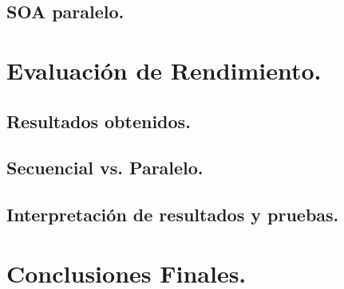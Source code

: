\documentclass{article}
\begin{document}
\subsection{SOA paralelo.}

\section{Evaluación de Rendimiento.\label{performance}}
\subsection{Resultados obtenidos.}
\subsection{Secuencial vs. Paralelo.}
\subsection{Interpretación de resultados y pruebas.}

\section{Conclusiones Finales.\label{conclusiones}}
\end{document}
